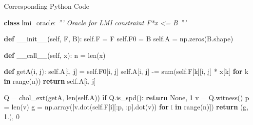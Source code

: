 \documentclass[10pt,ignorenonframetext,serif,onlymath]{beamer}
\newenvironment{Shaded}{}{}
\newcommand{\BuiltInTok}[1]{#1}
\newcommand{\CommentTok}[1]{\textcolor[rgb]{0.38,0.63,0.69}{\textit{#1}}}
\newcommand{\ControlFlowTok}[1]{\textcolor[rgb]{0.00,0.44,0.13}{\textbf{#1}}}
\newcommand{\DecValTok}[1]{\textcolor[rgb]{0.25,0.63,0.44}{#1}}
\newcommand{\FloatTok}[1]{\textcolor[rgb]{0.25,0.63,0.44}{#1}}
\newcommand{\FunctionTok}[1]{\textcolor[rgb]{0.02,0.16,0.49}{#1}}
\newcommand{\KeywordTok}[1]{\textcolor[rgb]{0.00,0.44,0.13}{\textbf{#1}}}
\newcommand{\NormalTok}[1]{#1}
\newcommand{\OperatorTok}[1]{\textcolor[rgb]{0.40,0.40,0.40}{#1}}
\newcommand{\VariableTok}[1]{\textcolor[rgb]{0.10,0.09,0.49}{#1}}
\begin{document}
\begin{frame}[fragile]{Corresponding Python Code}
\protect\hypertarget{corresponding-python-code-4}{}

\scriptsize

\begin{Shaded}
\begin{Highlighting}[]
\KeywordTok{class}\NormalTok{ lmi_oracle:}
    \CommentTok{''' Oracle for LMI constraint F*x <= B '''}

    \KeywordTok{def} \FunctionTok{__init__}\NormalTok{(}\VariableTok{self}\NormalTok{, F, B):}
        \VariableTok{self}\NormalTok{.F }\OperatorTok{=}\NormalTok{ F}
        \VariableTok{self}\NormalTok{.F0 }\OperatorTok{=}\NormalTok{ B}
        \VariableTok{self}\NormalTok{.A }\OperatorTok{=}\NormalTok{ np.zeros(B.shape)}

    \KeywordTok{def} \FunctionTok{__call__}\NormalTok{(}\VariableTok{self}\NormalTok{, x):}
\NormalTok{        n }\OperatorTok{=} \BuiltInTok{len}\NormalTok{(x)}

        \KeywordTok{def}\NormalTok{ getA(i, j):}
            \VariableTok{self}\NormalTok{.A[i, j] }\OperatorTok{=} \VariableTok{self}\NormalTok{.F0[i, j]}
            \VariableTok{self}\NormalTok{.A[i, j] }\OperatorTok{-=} \BuiltInTok{sum}\NormalTok{(}\VariableTok{self}\NormalTok{.F[k][i, j] }\OperatorTok{*}\NormalTok{ x[k]}
                                \ControlFlowTok{for}\NormalTok{ k }\KeywordTok{in} \BuiltInTok{range}\NormalTok{(n))}
            \ControlFlowTok{return} \VariableTok{self}\NormalTok{.A[i, j]}

\NormalTok{        Q }\OperatorTok{=}\NormalTok{ chol_ext(getA, }\BuiltInTok{len}\NormalTok{(}\VariableTok{self}\NormalTok{.A))}
        \ControlFlowTok{if}\NormalTok{ Q.is_spd(): }\ControlFlowTok{return} \VariableTok{None}\NormalTok{, }\DecValTok{1}
\NormalTok{        v }\OperatorTok{=}\NormalTok{ Q.witness()}
\NormalTok{        p }\OperatorTok{=} \BuiltInTok{len}\NormalTok{(v)}
\NormalTok{        g }\OperatorTok{=}\NormalTok{ np.array([v.dot(}\VariableTok{self}\NormalTok{.F[i][:p, :p].dot(v))}
                      \ControlFlowTok{for}\NormalTok{ i }\KeywordTok{in} \BuiltInTok{range}\NormalTok{(n)])}
        \ControlFlowTok{return}\NormalTok{ (g, }\FloatTok{1.}\NormalTok{), }\DecValTok{0}
\end{Highlighting}
\end{Shaded}

\end{frame}
\end{document}
